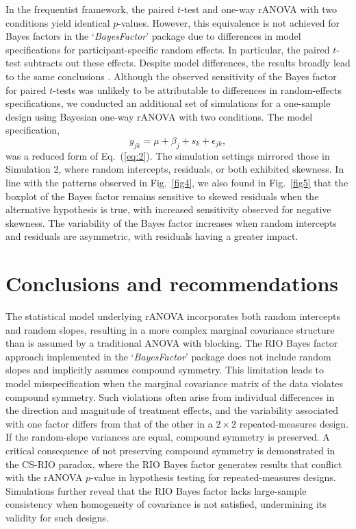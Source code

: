 \documentclass[preprint,12pt,authoryear]{elsarticle}
\begin{document}
In the frequentist framework, the paired $t$-test and one-way rANOVA with two conditions yield identical $p$-values. However, this equivalence is not achieved for Bayes factors in the `\textit{BayesFactor}' package due to differences in model specifications for participant-specific random effects. In particular, the paired $t$-test subtracts out these effects. Despite model differences, the results broadly lead to the same conclusions \citep[see vignettes `Prior checks' in][]{morey_bayesfactor_2024}. Although the observed sensitivity of the Bayes factor for paired $t$-tests was unlikely to be attributable to differences in random-effects specifications, we conducted an additional set of simulations for a one-sample design using Bayesian one-way rANOVA with two conditions. The model specification,
\begin{equation*}
	y_{jk}=\mu+\beta_j+s_k+\epsilon_{jk},
\end{equation*}
was a reduced form of Eq.~(\ref{eq:2}). The simulation settings mirrored those in Simulation 2, where random intercepts, residuals, or both exhibited skewness. In line with the patterns observed in Fig.~\ref{fig4}, we also found in Fig.~\ref{fig5} that the boxplot of the Bayes factor remains sensitive to skewed residuals when the alternative hypothesis is true, with increased sensitivity observed for negative skewness. The variability of the Bayes factor increases when random intercepts and residuals are asymmetric, with residuals having a greater impact.


\section{Conclusions and recommendations}
\label{sec5}

The statistical model underlying rANOVA incorporates both random intercepts and random slopes, resulting in a more complex marginal covariance structure than is assumed by a traditional ANOVA with blocking. The RIO Bayes factor approach implemented in the `\textit{BayesFactor}' package does not include random slopes and implicitly assumes compound symmetry. This limitation leads to model misspecification when the marginal covariance matrix of the data violates compound symmetry. Such violations often arise from individual differences in the direction and magnitude of treatment effects, and the variability associated with one factor differs from that of the other in a $2\times2$ repeated-measures design. If the random-slope variances are equal, compound symmetry is preserved. A critical consequence of not preserving compound symmetry is demonstrated in the CS-RIO paradox, where the RIO Bayes factor generates results that conflict with the rANOVA $p$-value in hypothesis testing for repeated-measures designs. Simulations further reveal that the RIO Bayes factor lacks large-sample consistency when homogeneity of covariance is not satisfied, undermining its validity for such designs.
\end{document}
